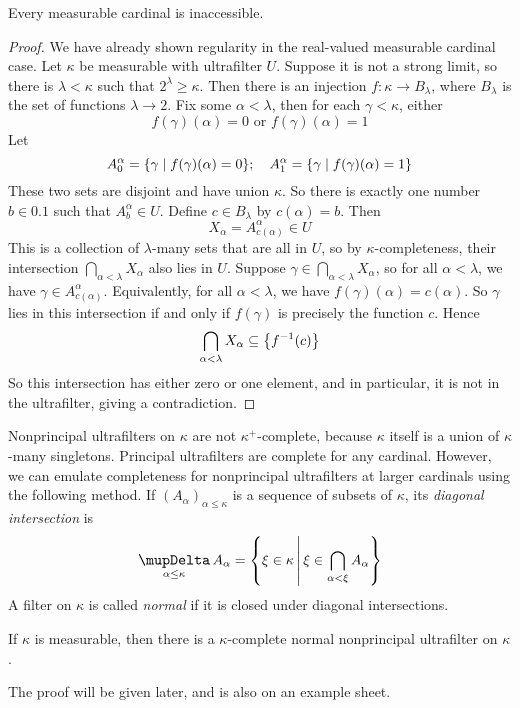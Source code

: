 \begin{theorem}
    Every measurable cardinal is inaccessible.
\end{theorem}
\begin{proof}
    We have already shown regularity in the real-valued measurable cardinal case.
    Let \( \kappa \) be measurable with ultrafilter \( U \).
    Suppose it is not a strong limit, so there is \( \lambda < \kappa \) such that \( 2^\lambda \geq \kappa \).
    Then there is an injection \( f : \kappa \to B_\lambda \), where \( B_\lambda \) is the set of functions \( \lambda \to 2 \).
    Fix some \( \alpha < \lambda \), then for each \( \gamma < \kappa \), either
    \[ f(\gamma)(\alpha) = 0 \text{ or } f(\gamma)(\alpha) = 1 \]
    Let
    \[ A_0^\alpha = \qty{\gamma \mid f(\gamma)(\alpha) = 0};\quad A_1^\alpha = \qty{\gamma \mid f(\gamma)(\alpha) = 1} \]
    These two sets are disjoint and have union \( \kappa \).
    So there is exactly one number \( b \in \qty{0,1} \) such that \( A^\alpha_b \in U \).
    Define \( c \in B_\lambda \) by \( c(\alpha) = b \).
    Then
    \[ X_\alpha = A^\alpha_{c(\alpha)} \in U \]
    This is a collection of \( \lambda \)-many sets that are all in \( U \), so by \( \kappa \)-completeness, their intersection \( \bigcap_{\alpha < \lambda} X_\alpha \) also lies in \( U \).
    Suppose \( \gamma \in \bigcap_{\alpha < \lambda} X_\alpha \), so for all \( \alpha < \lambda \), we have \( \gamma \in A^\alpha_{c(\alpha)} \).
    Equivalently, for all \( \alpha < \lambda \), we have \( f(\gamma)(\alpha) = c(\alpha) \).
    So \( \gamma \) lies in this intersection if and only if \( f(\gamma) \) is precisely the function \( c \).
    Hence
    \[ \bigcap_{\alpha < \lambda} X_\alpha \subseteq \qty{f^{-1}(c)} \]
    So this intersection has either zero or one element, and in particular, it is not in the ultrafilter, giving a contradiction.
\end{proof}
Nonprincipal ultrafilters on \( \kappa \) are not \( \kappa^+ \)-complete, because \( \kappa \) itself is a union of \( \kappa \)-many singletons.
Principal ultrafilters are complete for any cardinal.
However, we can emulate completeness for nonprincipal ultrafilters at larger cardinals using the following method.
If \( (A_\alpha)_{\alpha \leq \kappa} \) is a sequence of subsets of \( \kappa \), its \emph{diagonal intersection} is
\[ \operatorname*{\scalerel*{\mupDelta}{\textstyle\sum}}_{\alpha \leq \kappa} A_\alpha = \qty{\xi \in \kappa \midd \xi \in \bigcap_{\alpha < \xi} A_\alpha} \]
A filter on \( \kappa \) is called \emph{normal} if it is closed under diagonal intersections.
\begin{theorem}
    If \( \kappa \) is measurable, then there is a \( \kappa \)-complete normal nonprincipal ultrafilter on \( \kappa \).
\end{theorem}
The proof will be given later, and is also on an example sheet.

